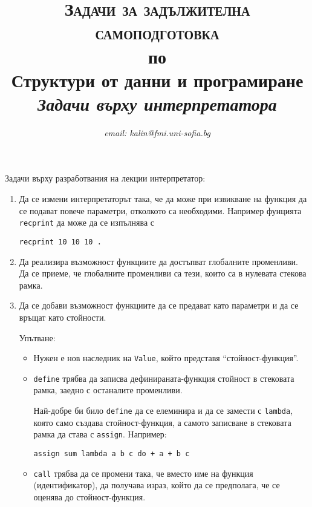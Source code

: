 \documentclass[12pt,a4paper]{article}
\author{\textit{email: kalin@fmi.uni-sofia.bg}}
\title{\textsc{Задачи за задължителна самоподготовка} \\
по \\
Структури от данни и програмиране\\
\textit{Задачи върху интерпретатора}}
\begin{document}
\maketitle

Задачи върху разработвания на лекции интерпретатор:

\begin{enumerate}
	\item Да се измени интерпретаторът така, че да може при извикване на функция да се подават повече параметри, отколкото са необходими. Например фунцията \texttt{recprint} да може да се изпълнява с

	 \texttt{recprint 10 10 10 .}


	\item Да реализира възможност функциите да достъпват глобалните променливи. Да се приеме, че глобалните променливи са тези, които са в нулевата стекова рамка.

	\item Да се добави възможност функциите да се предават като параметри и да се връщат като стойности. 

	\begin{flushleft}
	Упътване: 
	\begin{itemize}
		\item Нужен е нов наследник на \texttt{Value}, който представя ``стойност-функция''. 
		\item \texttt{define} трябва да записва дефинираната-функция стойност в стековата рамка, заедно с останалите променливи. 

		Най-добре би било \texttt{define} да се елеминира и да се замести с \texttt{lambda}, която само създава стойност-функция, а самото записване в стековата рамка да става с \texttt{assign}. Например:

		\texttt{assign sum lambda a b c do + a + b c}


		\item \texttt{call} трябва да се промени така, че вместо име на функция (идентификатор), да получава израз, който да се предполага, че се оценява до стойност-функция. 
	\end{itemize}
		
	\end{flushleft}
\end{enumerate}
\end{document}

